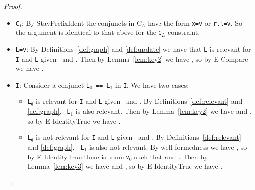 \begin{proof}
\begin{itemize}
\begin{itemize}
\item {\tt r.l=v}:  Then the relevant update maps {\tt r.l} to some {\tt
    v$'$} $\neq$ {\tt v} in {\tt \Huid$'$}.  But by {\sc Solve} and
  Lemma~\ref{lem:key1} any solution to  the constraint {\tt C$'$
    $\wedge$ C$_{E}$ $\wedge$ C$_{H}$} must map {\tt r.l} to {\tt v$'$}
  in the environment, which violates the constraint {\tt r.l=v}.  So there must be no solution to the constraints,
  contradicting our assumption of satisfiability.
\end{itemize}

\item {\tt C$_I$}:  By {\sc StayPrefixIdent}  the conjuncts in C$_L$
  have the form {\tt x=v} or {\tt r.l=v}.  So the argument is
  identical to that above for the {\tt C$_L$} constraint.

\item {\tt L=v}:  By Definitions~\ref{def:graph} and \ref{def:update}
  we have that {\tt L} is relevant for {\tt I} and {\tt L} given
  \Euid\ and \Huid.  Then by Lemma~\ref{lem:key2} we have 
, so by {\sc E-Compare} we have
.

\item {\tt I}:  Consider a conjunct {\tt L$_0$ == L$_1$} in {\tt I}.
  We have two cases:
\begin{itemize}
\item {\tt L$_0$} is relevant for {\tt I} and {\tt L} given \Euid\ and
  \Huid.  By Definitions~\ref{def:relevant} and \ref{def:graph}, {\tt
    L$_1$} is also relevant.  Then by Lemma~\ref{lem:key2} we have
 and
, so by {\sc E-IdentityTrue} we
have
.

\item {\tt L$_0$} is not relevant for {\tt I} and {\tt L} given \Euid\ and
  \Huid.  By Definitions~\ref{def:relevant} and \ref{def:graph}, {\tt
    L$_1$} is also not relevant.  By well formedness we have
, so by {\sc E-IdentityTrue}
there is some {\tt v$_0$} such that
 and
.
Then by Lemma~\ref{lem:key3} we have
 and
, so by {\sc E-IdentityTrue} we
have
. 
\end{itemize}

\end{itemize}
\end{proof}

